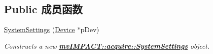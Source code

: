\subsection*{Public 成员函数}
\begin{DoxyCompactItemize}
\item 
\hyperlink{classmv_i_m_p_a_c_t_1_1acquire_1_1_system_settings_aa494575f3d3beef84ba4789ecaf182ae}{System\+Settings} (\hyperlink{classmv_i_m_p_a_c_t_1_1acquire_1_1_device}{Device} $\ast$p\+Dev)
\begin{DoxyCompactList}\small\item\em Constructs a new {\bfseries \hyperlink{classmv_i_m_p_a_c_t_1_1acquire_1_1_system_settings}{mv\+I\+M\+P\+A\+C\+T\+::acquire\+::\+System\+Settings}} object. \end{DoxyCompactList}\end{DoxyCompactItemize}
